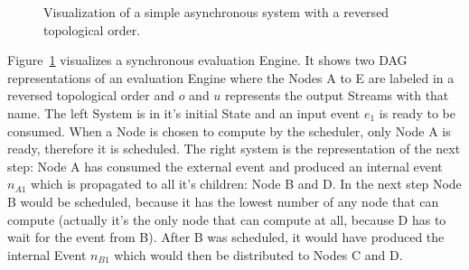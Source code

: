 \begin{figure}
  \caption{Visualization of a simple asynchronous system with a reversed topological order.}
\label{fig:chap3:sec_sync:visual_dag}
\end{figure}


Figure~\ref{fig:chap3:sec_sync:visual_dag} visualizes a synchronous evaluation Engine.
It shows two DAG representations of an evaluation Engine  where the Nodes A to E are labeled in a reversed topological order and \(o\) and \(u\) represents the output Streams with that name.
The left System is in it's initial State and an input event \(e_1\) is ready to be consumed.
When a Node is chosen to compute by the scheduler, only Node A is ready, therefore it is scheduled.
The right system is the representation of the next step: Node A has consumed the external event and produced an internal event \(n_{A1}\) which is propagated to all it's children: Node B and D.
In the next step Node B would be scheduled, because it has the lowest number of any node that can compute (actually it's the only node that can compute at all, because D has to wait for the event from B).
After B was scheduled, it would have produced the internal Event \(n_{B1}\) which would then be distributed to Nodes C and D.

